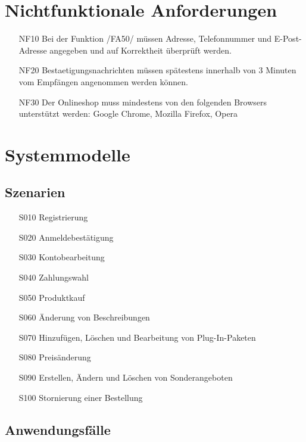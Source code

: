 \documentclass[parskip=full]{scrartcl}
\begin{document}
\section{Nichtfunktionale Anforderungen}
\begin{itemize}[nosep]
\item[NF10] Bei der Funktion /FA50/ müssen Adresse, Telefonnummer und E-Post-Adresse angegeben und auf Korrektheit überprüft werden.
\item[NF20] \gls{Bestaetigungsnachricht}en müssen spätestens innerhalb von 3 Minuten vom Empfängen angenommen werden können.
\item[NF30] Der \gls{Onlineshop} muss mindestens von den folgenden \gls{Browser}s unterstützt werden: Google Chrome, Mozilla Firefox, Opera
\end{itemize}

\section{Systemmodelle}

\subsection{Szenarien}
\begin{itemize}[nosep]
	\item[S010] Registrierung
	\item[S020] Anmeldebestätigung
	\item[S030] Kontobearbeitung
	\item[S040] Zahlungswahl
	\item[S050] Produktkauf
	\item[S060] Änderung von Beschreibungen
	\item[S070] Hinzufügen, Löschen und Bearbeitung von \gls{Plug-In}-Paketen
	\item[S080] Preisänderung
	\item[S090] Erstellen, Ändern und Löschen von \gls{Sonderangebot}en
	\item[S100] Stornierung einer Bestellung
\end{itemize}


\subsection{Anwendungsfälle}
\end{document}
